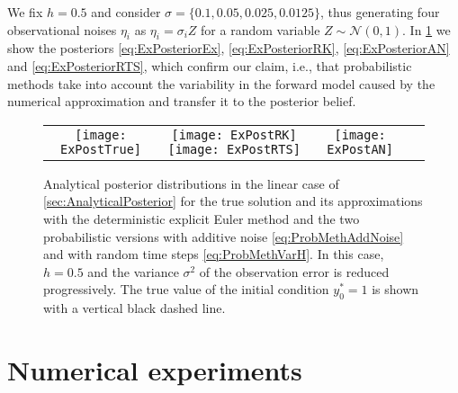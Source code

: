 \documentclass[final,onefignum,onetabnum]{siamonline171218}
\begin{document}
We fix $h = 0.5$ and consider $\sigma = \{0.1, 0.05, 0.025, 0.0125\}$, thus generating four observational noises $\eta_i$ as $\eta_i = \sigma_i Z$ for a random variable $Z \sim \mathcal{N}(0, 1)$. In \cref{fig:AnalyticalPosterior} we show the posteriors \eqref{eq:ExPosteriorEx}, \eqref{eq:ExPosteriorRK}, \eqref{eq:ExPosteriorAN} and \eqref{eq:ExPosteriorRTS}, which confirm our claim, i.e., that probabilistic methods take into account the variability in the forward model caused by the numerical approximation and transfer it to the posterior belief.

\begin{figure}
	\begin{center}
		
		\vspace{0.2cm}
		\begin{tabular}{cccc}
		\texttt{[image: ExPostTrue]} & \texttt{[image: ExPostRK]} \texttt{[image: ExPostRTS]} &	\texttt{[image: ExPostAN]}
		\end{tabular}	
	\end{center}
	\caption{Analytical posterior distributions in the linear case of \cref{sec:AnalyticalPosterior} for the true solution and its approximations with the deterministic explicit Euler method and the two probabilistic versions with additive noise \eqref{eq:ProbMethAddNoise} and with random time steps \eqref{eq:ProbMethVarH}. In this case, $h = 0.5$ and the variance $\sigma^2$ of the observation error is reduced progressively. The true value of the initial condition $y_0^* = 1$ is shown with a vertical black dashed line.}
	\label{fig:AnalyticalPosterior}
\end{figure}

\section{Numerical experiments}\label{sec:NumericalExperiments}
\end{document}
